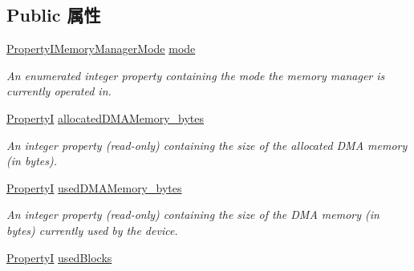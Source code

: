 \subsection*{Public 属性}
\begin{DoxyCompactItemize}
\item 
\hyperlink{group___device_specific_interface_ga7c5c7c1188a4d20b4d61879c6597000d}{Property\+I\+Memory\+Manager\+Mode} \hyperlink{classmv_i_m_p_a_c_t_1_1acquire_1_1_image_memory_manager_a614cfb478184bf6cb714e21feb93b624}{mode}
\begin{DoxyCompactList}\small\item\em An enumerated integer property containing the mode the memory manager is currently operated in. \end{DoxyCompactList}\item 
\hypertarget{classmv_i_m_p_a_c_t_1_1acquire_1_1_image_memory_manager_ac0dcd16463335bd1b79b12e653324d2e}{\hyperlink{group___common_interface_ga12d5e434238ca242a1ba4c6c3ea45780}{Property\+I} \hyperlink{classmv_i_m_p_a_c_t_1_1acquire_1_1_image_memory_manager_ac0dcd16463335bd1b79b12e653324d2e}{allocated\+D\+M\+A\+Memory\+\_\+bytes}}\label{classmv_i_m_p_a_c_t_1_1acquire_1_1_image_memory_manager_ac0dcd16463335bd1b79b12e653324d2e}

\begin{DoxyCompactList}\small\item\em An integer property {\bfseries }(read-\/only) containing the size of the allocated D\+M\+A memory (in bytes). \end{DoxyCompactList}\item 
\hypertarget{classmv_i_m_p_a_c_t_1_1acquire_1_1_image_memory_manager_a25451867b2a7e6330e4f39caae2fc600}{\hyperlink{group___common_interface_ga12d5e434238ca242a1ba4c6c3ea45780}{Property\+I} \hyperlink{classmv_i_m_p_a_c_t_1_1acquire_1_1_image_memory_manager_a25451867b2a7e6330e4f39caae2fc600}{used\+D\+M\+A\+Memory\+\_\+bytes}}\label{classmv_i_m_p_a_c_t_1_1acquire_1_1_image_memory_manager_a25451867b2a7e6330e4f39caae2fc600}

\begin{DoxyCompactList}\small\item\em An integer property {\bfseries }(read-\/only) containing the size of the D\+M\+A memory (in bytes) currently used by the device. \end{DoxyCompactList}\item 
\hypertarget{classmv_i_m_p_a_c_t_1_1acquire_1_1_image_memory_manager_ab68503cd380f87054888ace1c6b6fd4b}{\hyperlink{group___common_interface_ga12d5e434238ca242a1ba4c6c3ea45780}{Property\+I} \hyperlink{classmv_i_m_p_a_c_t_1_1acquire_1_1_image_memory_manager_ab68503cd380f87054888ace1c6b6fd4b}{used\+Blocks}}\label{classmv_i_m_p_a_c_t_1_1acquire_1_1_image_memory_manager_ab68503cd380f87054888ace1c6b6fd4b}


\end{DoxyCompactItemize}
